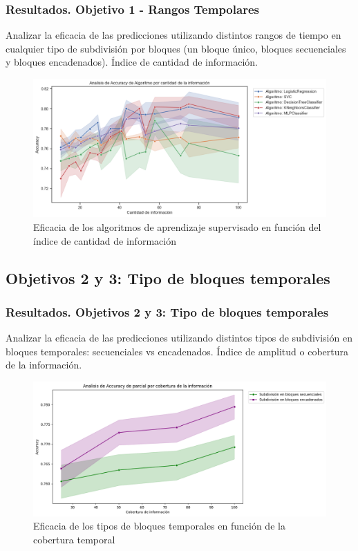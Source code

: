 \documentclass{beamer}
\begin{document}
\begin{frame}
	\frametitle{Resultados. Objetivo 1 - Rangos Tempolares}
	\begin{block}{Analizar la eficacia de las predicciones utilizando distintos rangos de tiempo en cualquier tipo de subdivisión por bloques (un bloque único, bloques secuenciales y bloques encadenados).}
		Índice de cantidad de información.
	\end{block}
	
\begin{figure}[H]
	\centering
	\includegraphics[width=0.6\linewidth]{figs/cap7/figura_13}
	\caption{Eficacia de los algoritmos de aprendizaje supervisado en función del índice de cantidad de información}
	\label{fig:figura207}
\end{figure}
	
	
\end{frame}


\subsection{ Objetivos 2 y 3: Tipo de bloques temporales}
\begin{frame}
	\frametitle{Resultados. Objetivos 2 y 3: Tipo de bloques temporales}
	\begin{block}{Analizar la eficacia de las predicciones utilizando
			distintos tipos de subdivisión en bloques temporales: secuenciales vs encadenados.}
		Índice de amplitud o cobertura de la información.
	\end{block}
	
\begin{figure}[H]
	\centering
	\includegraphics[width=0.7\linewidth]{figs/cap7/figura_15}
	\caption{Eficacia de los tipos de bloques temporales en función  de la cobertura temporal}
	
	\label{fig:figura212}
\end{figure}

\end{frame}
\end{document}
